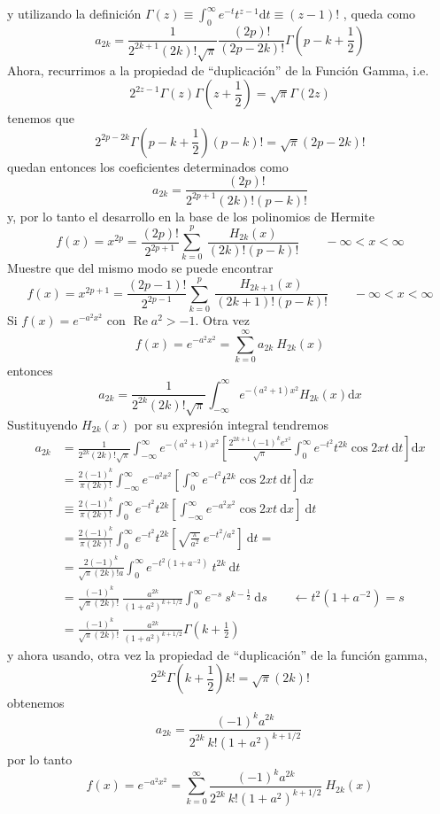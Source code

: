 \documentclass[spanish,notitlepage,letterpaper,12pt]{article}
\begin{document}
y utilizando la definici\'{o}n $\Gamma\left(  z\right)  \equiv\int_{0}%
^{\infty}e^{-t}t^{z-1}\mathrm{d}t\equiv\left(  z-1\right)  !$ , queda como
\[
a_{2k}=\frac1{2^{2k+1}(2k)!\sqrt{\pi}}\frac{\left(  2p\right)  !}{\left(
2p-2k\right)  !}\Gamma\left(  p-k+\frac12\right)
\]
Ahora, recurrimos a la propiedad de ``duplicaci\'{o}n'' de la Funci\'{o}n
Gamma, i.e.
\[
2^{2z-1}\Gamma\left(  z\right)  \Gamma\left(  z+\frac12\right)  =\sqrt{\pi
}\Gamma\left(  2z\right)
\]
tenemos que
\[
2^{2p-2k}\Gamma\left(  p-k+\frac12\right)  \left(  p-k\right)  !=\sqrt{\pi
}\left(  2p-2k\right)  !
\]
quedan entonces los coeficientes determinados como
\[
a_{2k}=\frac{\left(  2p\right)  !}{2^{2p+1}(2k)!\left(  p-k\right)  !}
\]
y, por lo tanto el desarrollo en la base de los polinomios de Hermite
\[
f(x)=x^{2p}=\frac{\left(  2p\right)  !}{2^{2p+1}}\sum_{k=0}^{p}\ \frac
{H_{2k}(x)}{(2k)!\left(  p-k\right)  !}\qquad-\infty<x<\infty
\]
Muestre que del mismo modo se puede encontrar
\[
f(x)=x^{2p+1}=\frac{\left(  2p-1\right)  !}{2^{2p-1}}\sum_{k=0}^{p}%
\ \frac{H_{2k+1}(x)}{(2k+1)!\left(  p-k\right)  !}\qquad-\infty<x<\infty
\]
Si $f(x)=e^{-a^{2}x^{2}}$ con $\operatorname{Re}a^{2}>-1.$ Otra vez
\[
f(x)=e^{-a^{2}x^{2}}=\sum_{k=0}^{\infty}a_{2k}\ H_{2k}(x)
\]
entonces
\begin{equation}
a_{2k}=\frac1{2^{2k}(2k)!\sqrt{\pi}}\int_{-\infty}^{\infty}e^{-(a^{2}+1)x^{2}%
}H_{2k}(x)\mathrm{d}x\nonumber
\end{equation}
Sustituyendo $H_{2k}(x)$ por su expresi\'{o}n integral tendremos
\begin{align*}
a_{2k}  & =\frac1{2^{2k}(2k)!\sqrt{\pi}}\int_{-\infty}^{\infty}e^{-(a^{2}%
+1)x^{2}}\left[  \frac{2^{2k+1}(-1)^{k}e^{x^{2}}}{\sqrt{\pi}}\int_{0}^{\infty
}e^{-t^{2}}t^{2k}\cos2xt\ \mathrm{d}t\right]  \mathrm{d}x\\
& =\frac{2(-1)^{k}}{\pi(2k)!}\int_{-\infty}^{\infty}e^{-a^{2}x^{2}}\left[
\int_{0}^{\infty}e^{-t^{2}}t^{2k}\cos2xt\ \mathrm{d}t\right]  \mathrm{d}x\\
& \equiv\frac{2(-1)^{k}}{\pi(2k)!}\int_{0}^{\infty}e^{-t^{2}}t^{2k}\left[
\int_{-\infty}^{\infty}e^{-a^{2}x^{2}}\cos2xt\ \mathrm{d}x\right]
\ \mathrm{d}t\\
& =\frac{2(-1)^{k}}{\pi(2k)!}\int_{0}^{\infty}e^{-t^{2}}t^{2k}\left[
\sqrt{\frac\pi{a^{2}}}\ e^{-t^{2}/a^{2}}\right]  \ \mathrm{d}t=\\
& =\frac{2(-1)^{k}}{\sqrt{\pi}(2k)!a}\int_{0}^{\infty}e^{-t^{2}(1+a^{-2}%
)}\ t^{2k}\ \mathrm{d}t\\
& =\frac{(-1)^{k}}{\sqrt{\pi}(2k)!}\ \frac{a^{2k}}{\left(  1+a^{2}\right)
^{k+1/2}}\int_{0}^{\infty}e^{-s}\ s^{k-\frac12}\ \mathrm{d}s\qquad\leftarrow
t^{2}(1+a^{-2})=s\\
& =\frac{(-1)^{k}}{\sqrt{\pi}(2k)!}\ \frac{a^{2k}}{\left(  1+a^{2}\right)
^{k+1/2}}\Gamma\left(  k+\frac12\right)
\end{align*}
y ahora usando, otra vez la propiedad de ``duplicaci\'{o}n'' de la funci\'{o}n
gamma,
\[
2^{2k}\Gamma\left(  k+\frac12\right)  k!=\sqrt{\pi}\left(  2k\right)  !
\]
obtenemos
\[
a_{2k}=\frac{(-1)^{k}a^{2k}}{2^{2k}\ k!\left(  1+a^{2}\right)  ^{k+1/2}}\
\]
por lo tanto
\[
f(x)=e^{-a^{2}x^{2}}=\sum_{k=0}^{\infty}\frac{(-1)^{k}a^{2k}}{2^{2k}%
\ k!\left(  1+a^{2}\right)  ^{k+1/2}}\ H_{2k}(x)
\]
\end{document}
